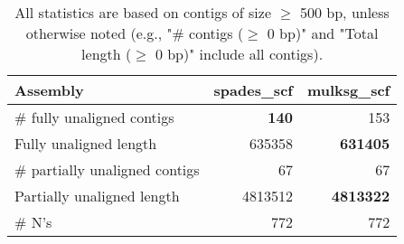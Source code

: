\documentclass[12pt,a4paper]{article}
\begin{document}
\begin{table}[ht]
\begin{center}
\caption{All statistics are based on contigs of size $\geq$ 500 bp, unless otherwise noted (e.g., "\# contigs ($\geq$ 0 bp)" and "Total length ($\geq$ 0 bp)" include all contigs).}
\begin{tabular}{|l*{2}{|r}|}
\hline
Assembly & spades\_scf & mulksg\_scf \\ \hline
\# fully unaligned contigs & {\bf 140} & 153 \\ \hline
Fully unaligned length & 635358 & {\bf 631405} \\ \hline
\# partially unaligned contigs & 67 & 67 \\ \hline
Partially unaligned length & 4813512 & {\bf 4813322} \\ \hline
\# N's & 772 & 772 \\ \hline
\end{tabular}
\end{center}
\end{table}
\end{document}
